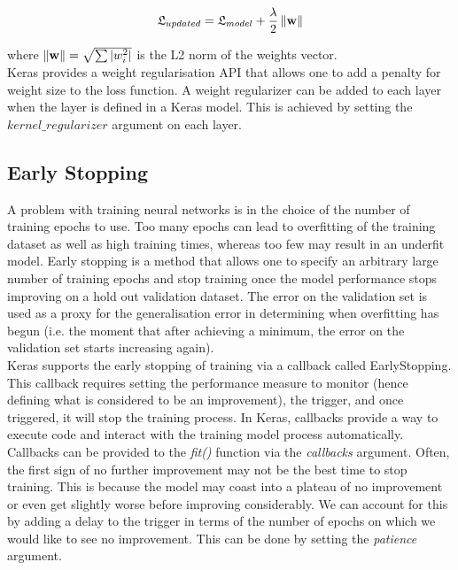 \begin{equation} \label{weight_decay}
  \centering
  \mathfrak{L}_{updated} = \mathfrak{L}_{model} + \frac{\lambda}{2} \norm{\textbf{w}}
\end{equation} 

where $\left\lVert\textbf{w}\right\rVert = \sqrt{\sum |w_i^2|}$ is the L2 norm of the weights vector.\\

Keras provides a weight regularisation API that allows one to add a penalty for weight size to the loss function. A weight regularizer can be added to each layer when the layer is defined in a Keras model. This is achieved by setting the $kernel\_regularizer$ argument on each layer.

\subsection{Early Stopping}
A problem with training neural networks is in the choice of the number of training epochs to use. Too many epochs can lead to overfitting of the training dataset as well as high training times, whereas too few may result in an underfit model. Early stopping is a method that allows one to specify an arbitrary large number of training epochs and stop training once the model performance stops improving on a hold out validation dataset. The error on the validation set is used as a proxy for the generalisation error in determining when overfitting has begun (i.e. the moment that after achieving a minimum, the error on the validation set starts increasing again).\\

Keras supports the early stopping of training via a callback called EarlyStopping. This callback requires setting the performance measure to monitor (hence defining what is considered to be an improvement), the trigger, and once triggered, it will stop the training process. In Keras, callbacks provide a way to execute code and interact with the training model process automatically. Callbacks can be provided to the \textit{fit()} function via the \textit{callbacks} argument. Often, the first sign of no further improvement may not be the best time to stop training. This is because the model may coast into a plateau of no improvement or even get slightly worse before improving considerably. We can account for this by adding a delay to the trigger in terms of the number of epochs on which we would like to see no improvement. This can be done by setting the \textit{patience} argument. \\

